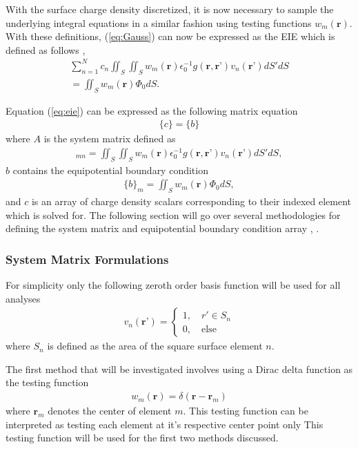 With the surface charge density discretized, it is now necessary to sample the underlying integral equations in a similar fashion using testing functions $w_m(\textbf{r})$. With these definitions, (\ref{eq:Gauss}) can now be expressed as the EIE which is defined as follows \cite{rothlecnotes}, \cite{jin2011theory}
\begin{multline}
    \sum_{n=1}^{N}c_n\iint_S\iint_Sw_m(\textbf{r})\epsilon_0^{-1}g(\textbf{r},\textbf{r'})v_n(\textbf{r'})dS'dS \\ =\iint_Sw_m(\textbf{r})\Phi_0dS.
    \label{eq:eie}
\end{multline}

Equation (\ref{eq:eie}) can be expressed as the following matrix equation
\begin{align}
    [A]\{c\}=\{b\}
    \label{eq:linsys}
\end{align}
where $A$ is the system matrix defined as
\begin{align}
    [A]_{mn}=\iint_S\iint_Sw_m(\textbf{r})\epsilon_0^{-1}g(\textbf{r},\textbf{r'})v_n(\textbf{r'})dS'dS,
    \label{eq:a}
\end{align}
$b$ contains the equipotential boundary condition
\begin{align}
    \{b\}_m=\iint_Sw_m(\textbf{r})\Phi_0dS,
    \label{eq:b}
\end{align}
and ${c}$ is an array of charge density scalars corresponding to their indexed element which is solved for. The following section will go over several methodologies for defining the system matrix and equipotential boundary condition array \cite{rothlecnotes}, \cite{jin2011theory}.

\subsubsection{System Matrix Formulations}
\label{subsub:mat-form}

For simplicity only the following zeroth order basis function will be used for all analyses
\begin{align}
    v_n(\textbf{r'})=\begin{cases}
        1,\quad r'\in S_n\\
        0,\quad \mathrm{else}
    \end{cases}
\end{align}
where $S_n$ is defined as the area of the square surface element $n$.

The first method that will be investigated involves using a Dirac delta function as the testing function
\begin{align}
    w_m(\textbf{r})=\delta (\textbf{r}-\textbf{r}_m)
    \label{eq:Dirac}
\end{align} 
where $\textbf{r}_m$ denotes the center of element $m$. This testing function can be interpreted as testing each element at it's respective center point only \cite{rothlecnotes} This testing function will be used for the first two methods discussed.

